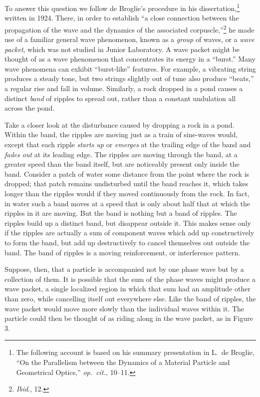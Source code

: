 To answer this question we follow de Broglie's procedure in his
dissertation,\footnote{The following account is based on his summary
  presentation in L.\ de Broglie, ``On the Parallelism between the
  Dynamics of a Material Particle and Geometrical Optics,'' \emph{op.\
  cit.,} 10--11.} written in 1924. There, in order to establish ``a close
connection between the propagation of the wave and the dynamics of the
associated corpuscle,''\footnote{\emph{Ibid}., 12.} he made use of a
familiar general wave phenomenon, known as a \emph{group} of waves, or a
\emph{wave packet}, which was not studied in Junior Laboratory. A wave
packet might be thought of as a wave phenomenon that concentrates its
energy in a ``burst.'' Many wave phenomena can exhibit ``burst-like''
features. For example, a vibrating string produces a steady tone, but
two strings slightly out of tune also produce ``beats,'' a regular rise
and fall in volume. Similarly, a rock dropped in a pond causes a
distinct \emph{band} of ripples to spread out, rather than a constant
undulation all across the pond.

Take a closer look at the disturbance caused by dropping a rock in a
pond. Within the band, the ripples are moving
just as a train of sine-waves would, except that each ripple
\emph{starts up} or \emph{emerges} at the trailing edge of the
band and \emph{fades out} at its leading edge. The ripples are moving
through the band, at a greater speed than the band itself, but are
noticeably present only inside the band. Consider a patch of water some
distance from the point where the rock is dropped; that patch remains
undisturbed until the band reaches it, which takes longer than the
ripples would if they moved continuously from the rock. In fact, in
water such a band moves at a speed that is only about half that at which
the ripples in it are moving. But the band is nothing but a band of
ripples. The ripples build up a distinct band, but disappear outside it.
This makes sense only if the ripples are actually a sum of component
waves which add up constructively to form the band, but add up
destructively to cancel themselves out outside the band. The band of
ripples is a moving reinforcement, or interference pattern.

Suppose, then, that a particle is accompanied not by one phase wave but
by a collection of them. It is possible that the sum of the phase waves
might produce a wave packet, a single localized region in which that sum
had an amplitude other than zero, while cancelling itself out everywhere
else. Like the band of ripples, the wave packet would move more slowly
than the individual waves within it. The particle could then be thought
of as riding along in the wave packet, as in Figure 3.

